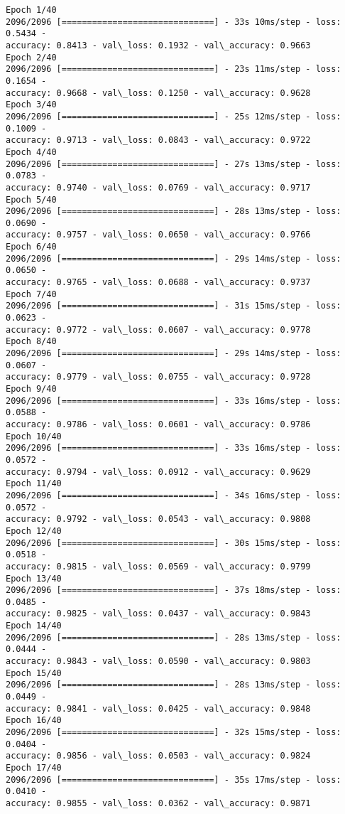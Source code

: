 \documentclass[11pt]{article}
\begin{document}
    \begin{Verbatim}[commandchars=\\\{\}]
Epoch 1/40
2096/2096 [==============================] - 33s 10ms/step - loss: 0.5434 -
accuracy: 0.8413 - val\_loss: 0.1932 - val\_accuracy: 0.9663
Epoch 2/40
2096/2096 [==============================] - 23s 11ms/step - loss: 0.1654 -
accuracy: 0.9668 - val\_loss: 0.1250 - val\_accuracy: 0.9628
Epoch 3/40
2096/2096 [==============================] - 25s 12ms/step - loss: 0.1009 -
accuracy: 0.9713 - val\_loss: 0.0843 - val\_accuracy: 0.9722
Epoch 4/40
2096/2096 [==============================] - 27s 13ms/step - loss: 0.0783 -
accuracy: 0.9740 - val\_loss: 0.0769 - val\_accuracy: 0.9717
Epoch 5/40
2096/2096 [==============================] - 28s 13ms/step - loss: 0.0690 -
accuracy: 0.9757 - val\_loss: 0.0650 - val\_accuracy: 0.9766
Epoch 6/40
2096/2096 [==============================] - 29s 14ms/step - loss: 0.0650 -
accuracy: 0.9765 - val\_loss: 0.0688 - val\_accuracy: 0.9737
Epoch 7/40
2096/2096 [==============================] - 31s 15ms/step - loss: 0.0623 -
accuracy: 0.9772 - val\_loss: 0.0607 - val\_accuracy: 0.9778
Epoch 8/40
2096/2096 [==============================] - 29s 14ms/step - loss: 0.0607 -
accuracy: 0.9779 - val\_loss: 0.0755 - val\_accuracy: 0.9728
Epoch 9/40
2096/2096 [==============================] - 33s 16ms/step - loss: 0.0588 -
accuracy: 0.9786 - val\_loss: 0.0601 - val\_accuracy: 0.9786
Epoch 10/40
2096/2096 [==============================] - 33s 16ms/step - loss: 0.0572 -
accuracy: 0.9794 - val\_loss: 0.0912 - val\_accuracy: 0.9629
Epoch 11/40
2096/2096 [==============================] - 34s 16ms/step - loss: 0.0572 -
accuracy: 0.9792 - val\_loss: 0.0543 - val\_accuracy: 0.9808
Epoch 12/40
2096/2096 [==============================] - 30s 15ms/step - loss: 0.0518 -
accuracy: 0.9815 - val\_loss: 0.0569 - val\_accuracy: 0.9799
Epoch 13/40
2096/2096 [==============================] - 37s 18ms/step - loss: 0.0485 -
accuracy: 0.9825 - val\_loss: 0.0437 - val\_accuracy: 0.9843
Epoch 14/40
2096/2096 [==============================] - 28s 13ms/step - loss: 0.0444 -
accuracy: 0.9843 - val\_loss: 0.0590 - val\_accuracy: 0.9803
Epoch 15/40
2096/2096 [==============================] - 28s 13ms/step - loss: 0.0449 -
accuracy: 0.9841 - val\_loss: 0.0425 - val\_accuracy: 0.9848
Epoch 16/40
2096/2096 [==============================] - 32s 15ms/step - loss: 0.0404 -
accuracy: 0.9856 - val\_loss: 0.0503 - val\_accuracy: 0.9824
Epoch 17/40
2096/2096 [==============================] - 35s 17ms/step - loss: 0.0410 -
accuracy: 0.9855 - val\_loss: 0.0362 - val\_accuracy: 0.9871

\end{Verbatim}
\end{document}
